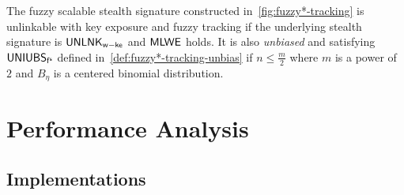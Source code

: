 \begin{theorem}[informal]
\label{thm:scalable-abs}
The fuzzy scalable stealth signature constructed in~\cref{fig:fuzzy*-tracking} is unlinkable with key exposure and fuzzy tracking if the underlying stealth signature is $\mathsf{UNLNK}_\mathsf{w-ke}$ and $\mathsf{MLWE}$ holds. It is also \emph{unbiased} and satisfying $\mathsf{UNIUBS}_\mathsf{f^s}$ defined in~\cref{def:fuzzy*-tracking-unbias} if $n\le \frac{m}{2}$ where $m$ is a power of $2$ and $B_\eta$ is a centered binomial distribution.
\end{theorem}



\section{Performance Analysis}
\label{sec:implement}
\subsection{Implementations}

